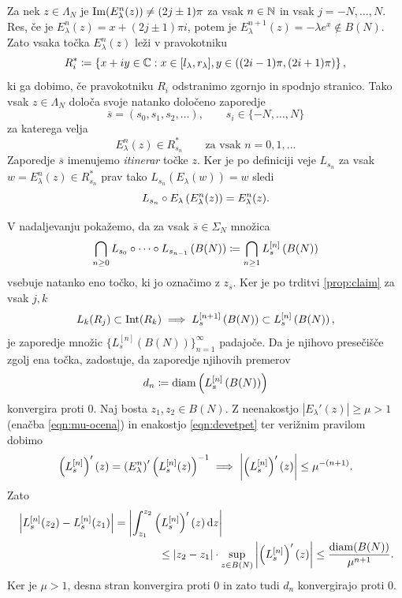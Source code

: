 Za nek \(z \in \Lambda_N\) je \(\operatorname{Im} (E_\lambda^n (z)) \neq (2j \pm 1) \pi\) za vsak \(n \in \mathbb N\) in vsak \(j = -N, \dots, N\). Res, če je \(E_\lambda^n (z) = x + (2j \pm 1) \pi i\), potem je \(E_\lambda^{n + 1} (z) = - \lambda e^x \notin B (N)\). Zato vsaka točka \(E_\lambda^n (z)\) leži v pravokotniku
\[R_i^* \coloneq \left\{ x + iy \in \mathbb C : x \in [l_\lambda, r_\lambda], y \in ((2i - 1) \pi, (2i + 1) \pi) \right\},\]
ki ga dobimo, če pravokotniku \(R_i\) odstranimo zgornjo in spodnjo stranico. Tako vsak \(z \in \Lambda_N\) določa svoje natanko določeno zaporedje
\[\overline{s} = (s_0, s_1, s_2, \dots), \qquad s_i \in \{-N, \dots, N\}\]
za katerega velja
\begin{equation} \label{eqn:itinerar}
    E_\lambda^n (z) \in R_{s_n}^* \qquad \text{za vsak } n = 0, 1, \dots
\end{equation}
Zaporedje \(\overline{s}\) imenujemo \emph{itinerar} točke \(z\). Ker je po definiciji veje \(L_{s_n}\) za vsak \(w = E_\lambda^n (z) \in R_{s_n}^*\) prav tako \(L_{s_n} (E_\lambda (w)) = w\) sledi
\begin{equation} \label{eqn:devetpet}
    L_{s_n} \circ E_\lambda \left( E_\lambda^n (z) \right) = E_\lambda^n (z).
\end{equation}

V nadaljevanju pokažemo, da za vsak \(\overline{s} \in \Sigma_N\) množica
\[\bigcap_{n \geq 0} L_{s_0} \circ \dots \circ L_{s_{n - 1}} \left( B (N) \right) \coloneq \bigcap_{n \geq 1} L_s^{[n]} \left( B (N) \right)\]
vsebuje natanko eno točko, ki jo označimo z \(z_{\overline{s}}\). Ker je po trditvi \ref{prop:claim} za vsak \(j, k\)
\[L_k (R_j) \subset \operatorname{Int} (R_k) \implies L_s^{[n + 1]} \left( B (N) \right) \subset L_s^{[n]} \left( B (N) \right),\]
je zaporedje množic \(\{L_s^{[n]} (B (N))\}_{n = 1}^{\infty}\) padajoče. Da je njihovo presečišče zgolj ena točka, zadostuje, da zaporedje njihovih premerov
\[d_n \coloneq \operatorname{diam} \left( L_s^{[n]} \left( B (N) \right) \right)\]
konvergira proti \num{0}. Naj bosta \(z_1, z_2 \in B(N)\). Z neenakostjo \(|E_\lambda' (z)| \geq \mu > 1\) (enačba \eqref{eqn:mu-ocena}) in enakostjo \eqref{eqn:devetpet} ter verižnim pravilom dobimo
\[\left( L_s^{[n]} \right)' (z) = \left( E_\lambda^n \right)' \left( L_s^{[n]} (z) \right)^{-1} \implies \left\lvert\left( L_s^{[n]} \right)' (z)\right\rvert \leq \mu^{- (n + 1)}.\]
Zato
\[ \begin{multlined}[12cm]
        \left| L_s^{[n]}(z_2) - L_s^{[n]}(z_1) \right| = \left| \int_{z_1}^{z_2} \prt{L_s^{[n]}}' (z) \, \dd z \right|\\
        \leq |z_2 - z_1| \cdot \sup_{z \in B(N)}\left| \left( L_s^{[n]} \right)'(z) \right| \leq \frac{\diam (B(N))}{\mu^{n+1}}.
    \end{multlined} \]
Ker je \(\mu > 1\), desna stran konvergira proti \num{0} in zato tudi \(d_n\) konvergirajo proti \num{0}.

